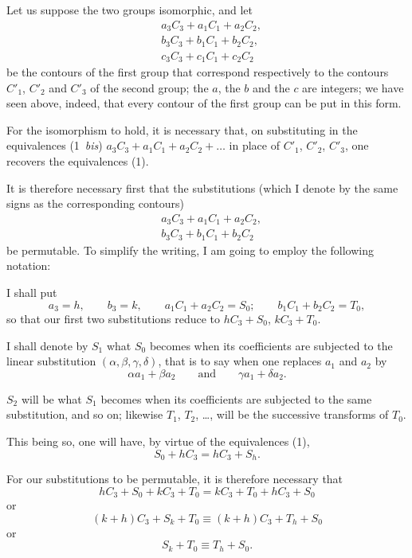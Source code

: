 \documentclass{article}
\begin{document}
Let us suppose the two groups isomorphic, and let
\[ \begin{aligned} &a_{3}C_{3} + a_{1}C_{1} + a_{2}C_{2},\\ &b_{3}C_{3} + b_{1}C_{1} + b_{2}C_{2},\\ &c_{3}C_{3} + c_{1}C_{1} + c_{2}C_{2} \end{aligned} \]
be the contours of the first group that correspond respectively to the contours $C'_{1}$, $C'_{2}$ and $C'_{3}$ of the second group; the $a$, the $b$ and the $c$ are integers; we have seen above, indeed, that every contour of the first group can be put in this form.

For the isomorphism to hold, it is necessary that, on substituting in the equivalences (1~\emph{bis}) $a_{3}C_{3} + a_{1}C_{1} + a_{2}C_{2} + \ldots$ in place of $C'_{1}$, $C'_{2}$, $C'_{3}$, one recovers the equivalences (1).

It is therefore necessary first that the substitutions (which I denote by the same signs as the corresponding contours)
\[ \begin{aligned} &a_{3}C_{3} + a_{1}C_{1} + a_{2}C_{2},\\ &b_{3}C_{3} + b_{1}C_{1} + b_{2}C_{2} \end{aligned} \]
be permutable. To simplify the writing, I am going to employ the following notation:

I shall put
\[ a_{3} = h, \qquad b_{3} = k, \qquad a_{1}C_{1} + a_{2}C_{2} = S_{0}; \qquad b_{1}C_{1} + b_{2}C_{2} = T_{0}, \]
so that our first two substitutions reduce to $hC_{3} + S_{0}$, $kC_{3} + T_{0}$.

I shall denote by $S_{1}$ what $S_{0}$ becomes when its coefficients are subjected to the linear substitution $(\alpha, \beta, \gamma, \delta)$, that is to say when one replaces $a_{1}$ and $a_{2}$ by
\[ \alpha a_{1} + \beta a_{2} \qquad \text{and} \qquad \gamma a_{1} + \delta a_{2}. \]

$S_{2}$ will be what $S_{1}$ becomes when its coefficients are subjected to the same substitution, and so on; likewise $T_{1}$, $T_{2}$, \ldots, will be the successive transforms of $T_{0}$.

This being so, one will have, by virtue of the equivalences (1),
\[ S_{0} + hC_{3} = hC_{3} + S_{h}. \]

For our substitutions to be permutable, it is therefore necessary that
\[ hC_{3} + S_{0} + kC_{3} + T_{0} = kC_{3} + T_{0} + hC_{3} + S_{0} \]
or
\[ (k + h)C_{3} + S_{k} + T_{0} \equiv (k + h)C_{3} + T_{h} + S_{0} \]
or
\[ S_{k} + T_{0} \equiv T_{h} + S_{0}. \tag{$\lambda$} \]
\end{document}
